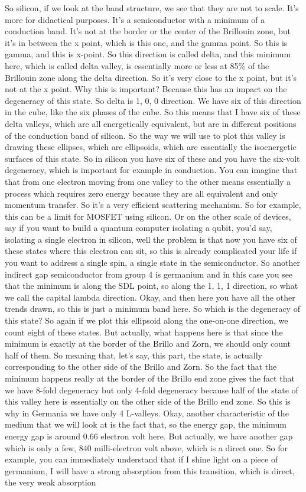 So silicon, if we look at the band structure, we see that they are not to scale. It's more for didactical purposes. It's a semiconductor with a minimum of a conduction band. It's not at the border or the center of the Brillouin zone, but it's in between the x point, which is this one, and the gamma point. So this is gamma, and this is x-point. So this direction is called delta, and this minimum here, which is called delta valley, is essentially more or less at 85\% of the Brillouin zone along the delta direction. So it's very close to the x point, but it's not at the x point. Why this is important? Because this has an impact on the degeneracy of this state. So delta is 1, 0, 0 direction. We have six of this direction in the cube, like the six phases of the cube. So this means that I have six of these delta valleys, which are all energetically equivalent, but are in different positions of the conduction band of silicon. So the way we will use to plot this valley is drawing these ellipses, which are ellipsoids, which are essentially the isoenergetic surfaces of this state. So in silicon you have six of these and you have the six-volt degeneracy, which is important for example in conduction. You can imagine that that from one electron moving from one valley to the other means essentially a process which requires zero energy because they are all equivalent and only momentum transfer. So it's a very efficient scattering mechanism. So for example, this can be a limit for MOSFET using silicon. Or on the other scale of devices, say if you want to build a quantum computer isolating a qubit, you'd say, isolating a single electron in silicon, well the problem is that now you have six of these states where this electron can sit, so this is already complicated your life if you want to address a single spin, a single state in the semiconductor. So another indirect gap semiconductor from group 4 is germanium and in this case you see that the minimum is along the SDL point, so along the 1, 1, 1 direction, so what we call the capital lambda direction. Okay, and then here you have all the other trends drawn, so this is just a minimum band here. So which is the degeneracy of this state? So again if we plot this ellipsoid along the one-on-one direction, we count eight of these states. But actually, what happens here is that since the minimum is exactly at the border of the Brillo and Zorn, we should only count half of them. So meaning that, let's say, this part, the state, is actually corresponding to the other side of the Brillo and Zorn. So the fact that the minimum happens really at the border of the Brillo end zone gives the fact that we have 8-fold degeneracy but only 4-fold degeneracy because half of the state of this valley here is essentially on the other side of the Brillo end zone. So this is why in Germania we have only 4 L-valleys. Okay, another characteristic of the medium that we will look at is the fact that, so the energy gap, the minimum energy gap is around 0.66 electron volt here. But actually, we have another gap which is only a few, 840 milli-electron volt above, which is a direct one. So for example, you can immediately understand that if I shine light on a piece of germanium, I will have a strong absorption from this transition, which is direct, the very weak absorption 